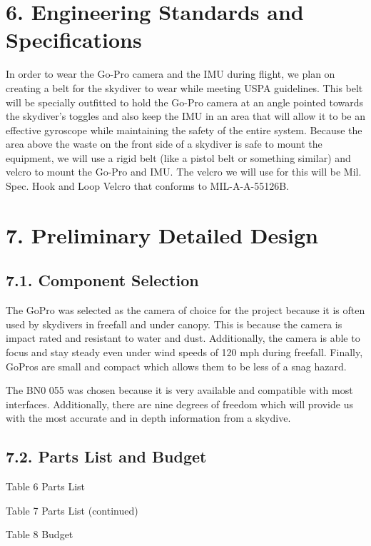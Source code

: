 \documentclass[10pt]{article}
\begin{document}
\section{6. Engineering Standards and Specifications}

In order to wear the Go-Pro camera and the IMU during flight, we plan on creating a belt for the skydiver to wear while meeting USPA guidelines. This belt will be specially outfitted to hold the Go-Pro camera at an angle pointed towards the skydiver’s toggles and also keep the IMU in an area that will allow it to be an effective gyroscope while maintaining the safety of the entire system. Because the area above the waste on the front side of a skydiver is safe to mount the equipment, we will use a rigid belt (like a pistol belt or something similar) and velcro to mount the Go-Pro and IMU. The velcro we will use for this will be Mil. Spec. Hook and Loop Velcro that conforms to MIL-A-A-55126B.



\section{7. Preliminary Detailed Design}

\subsection{7.1. Component Selection}

The GoPro was selected as the camera of choice for the project because it is often used by skydivers in freefall and under canopy. This is because the camera is impact rated and resistant to water and dust. Additionally, the camera is able to focus and stay steady even under wind speeds of 120 mph during freefall. Finally, GoPros are small and compact which allows them to be less of a snag hazard.

The BN0 055 was chosen because it is very available and compatible with most interfaces. Additionally, there are nine degrees of freedom which will provide us with the most accurate and in depth information from a skydive.

\subsection{7.2. Parts List and Budget}

Table 6 Parts List

Table 7 Parts List (continued)

Table 8 Budget
\end{document}
